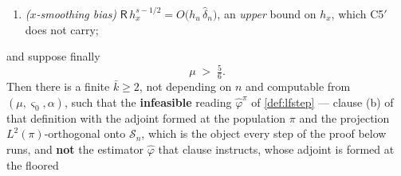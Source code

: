 \begin{proposition}
\begin{enumerate}
\item[(P-g)] \emph{($x$-smoothing bias)} $\mathsf R\,h_x^{s-1/2}=O\big(h_u\,\hat\delta_n\big)$, an
\emph{upper} bound on $h_x$, which C5$'$ does not carry;
\end{enumerate}
and suppose finally
\begin{equation}\label{eq:muhalf}
\mu\;>\;\tfrac56 .
\end{equation}
Then there is a finite $\bar k\ge2$, not depending on $n$ and computable from $(\mu,\varsigma_0,\alpha)$,
such that the \textbf{infeasible} reading $\hat\varphi^{\pi}$ of \cref{def:lfstep} --- clause
\textup{(b)} of that definition with the adjoint formed at the population $\pi$ and the projection
$L^{2}(\pi)$-orthogonal onto $\mathcal S_n$, which is the object every step of the proof below runs, and
\textbf{not} the estimator $\hat\varphi$ that clause instructs, whose adjoint is formed at the floored

\end{proposition}
